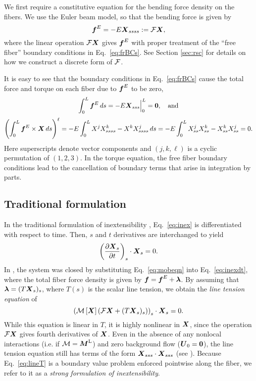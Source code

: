We first require a constitutive equation for the bending force density on the fibers. We use the Euler beam model, so that the bending force is given by
\begin{equation}
\label{eq:bforce}
    \boldsymbol{f}^E=-E\boldsymbol{X}_{ssss}:= \mathcal{F}\boldsymbol{X},
\end{equation}
where the linear operation $\mathcal{F}\boldsymbol{X}$ gives $ \boldsymbol{f}^E$ with proper treatment of the ``free fiber'' boundary conditions in Eq.\ \eqref{eq:frBCs}. See Section \ref{sec:rsc} for details on how we construct a discrete form of $\mathcal{F}$. 

It is easy to see that the boundary conditions in Eq.\ \eqref{eq:frBCs} cause the total force and torque on each fiber due to $\boldsymbol{f}^E$ to be zero, 
\begin{gather}
\label{eq:totfe}
\int_{0}^{L} \boldsymbol{f}^E \, ds = -E\boldsymbol{X}_{sss}\Big \rvert^{L}_{0} = \boldsymbol{0}, \quad \text{and}\\[2 pt]
\left(\int_{0}^{L} \boldsymbol{f}^E \times \boldsymbol{X} \, ds\right)^\ell = -E\int_{0}^{L} X^j X^k_{ssss} - X^k X^j_{ssss} \, ds = -E\int_{0}^{L} X^j_{ss}  X^k_{ss} -X^k_{ss} X^j _{ss} = 0. 
\end{gather}
Here superscripts denote vector components and $(j,k,\ell)$ is a cyclic permutation of $(1,2,3)$. In the torque equation, the free fiber boundary conditions lead to the cancellation of boundary terms that arise in integration by parts.

\subsection{Traditional formulation}
In the traditional formulation of inextensibility \cite{ts04}, Eq.\ \eqref{eq:inex} is differentiated with respect to time. Then, $s$ and $t$ derivatives are interchanged to yield
\begin{gather}
\label{eq:inexdt}
\left(\frac{\partial \boldsymbol{X}_s}{\partial t}\right)_s \cdot \boldsymbol{X}_s = 0. 
\end{gather}
In \cite{ts04}, the system was closed by substituting Eq.\ \eqref{eq:mobeqn} into Eq.\ \eqref{eq:inexdt}, where the total fiber force density is given by $\boldsymbol{f}=\boldsymbol{f}^E + \boldsymbol{\lambda}$. By assuming that $\boldsymbol{\lambda}=(T\boldsymbol{X}_s)_s$, where $T(s)$ is the scalar line tension, we obtain the \textit{line tension equation} of \cite{ts04}
\begin{equation}
\label{eq:lineT}
\left(\mathcal{M}\left[\boldsymbol{X}\right]\left(\mathcal{F}\boldsymbol{X}+(T\boldsymbol{X}_s)_s\right)\right)_s  \cdot \boldsymbol{X}_s = 0. 
\end{equation}
While this equation is linear in $T$, it is highly nonlinear in $\boldsymbol{X}$, since the operation $\mathcal{F}\boldsymbol{X}$ gives fourth derivatives of $\boldsymbol{X}$. Even in the absence of any nonlocal interactions (i.e. if $\mathcal{M}=\boldsymbol{M}^\text{L}$) and zero background flow ($\boldsymbol{U}_0=\boldsymbol{0}$), the line tension equation still has terms of the form $\boldsymbol{X}_{sss}\cdot \boldsymbol{X}_{sss}$ (see \cite[~Eq. (13)]{ts04}). Because Eq.\ \eqref{eq:lineT} is a boundary value problem enforced pointwise along the fiber, we refer to it as a \textit{strong formulation of inextensibility}. 

